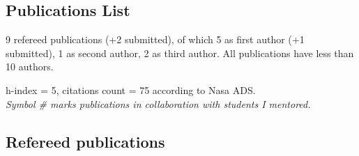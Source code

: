 

\vspace{-4mm}

\subsection*{\LARGE{Publications  List}}

\vspace{3mm}

9 refereed publications (+2 submitted), of which 5 as first author (+1 submitted), 1 as second author, 2 as third author. All publications have less than 10 authors.

h-index = 5, citations count = 75 according to Nasa ADS.\\

\textit{Symbol \# marks publications in collaboration with students I mentored.}

\vspace{2mm}

\subsection*{ Refereed publications}

